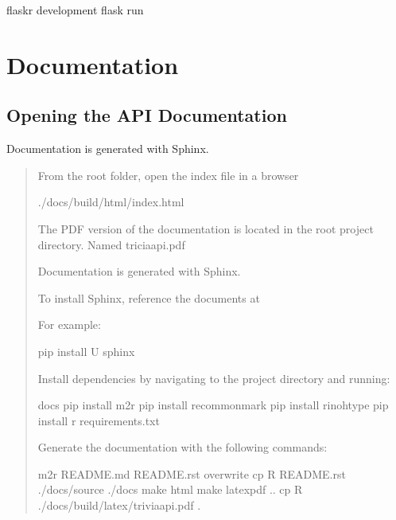 \documentclass[letterpaper,10pt,english]{sphinxmanual}
\begin{document}
\begin{sphinxVerbatim}[commandchars=\\\{\}]
 flaskr
 development
flask run
\end{sphinxVerbatim}


\section{Documentation}
\label{\detokenize{index:documentation}}

\subsection{Opening the API Documentation}
\label{\detokenize{index:opening-the-api-documentation}}
Documentation is generated with Sphinx.
\begin{quote}

From the root folder, open the index file in a browser

\begin{sphinxVerbatim}[commandchars=\\\{\}]
./docs/build/html/index.html
\end{sphinxVerbatim}

The PDF version of the documentation is located in the root project directory. Named triciaapi.pdf

Documentation is generated with Sphinx.

To install Sphinx, reference the documents at 

For example:

\begin{sphinxVerbatim}[commandchars=\\\{\}]
pip install \PYGZhy{}U sphinx
\end{sphinxVerbatim}

Install dependencies by navigating to the  project directory and running:

\begin{sphinxVerbatim}[commandchars=\\\{\}]
 docs
pip install m2r
pip install recommonmark
pip install rinohtype
pip install \PYGZhy{}r requirements.txt
\end{sphinxVerbatim}

Generate the documentation with the following commands:

\begin{sphinxVerbatim}[commandchars=\\\{\}]
m2r README.md README.rst \PYGZhy{}\PYGZhy{}overwrite
cp \PYGZhy{}R README.rst ./docs/source
 ./docs
make html
make latexpdf
 ..
cp \PYGZhy{}R ./docs/build/latex/triviaapi.pdf .
\end{sphinxVerbatim}
\end{quote}
\end{document}

